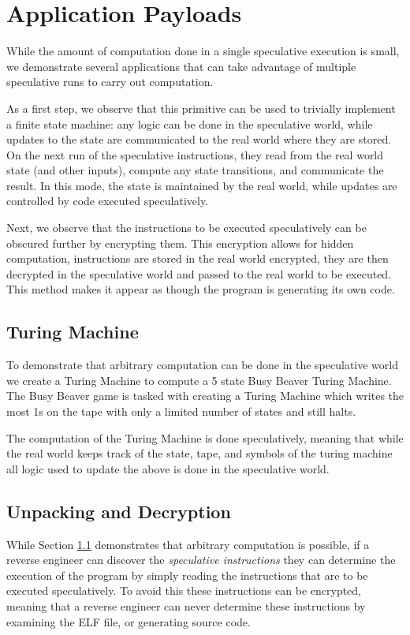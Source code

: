 
\section{Application Payloads}

While the amount of computation done in a single speculative execution is small,
we demonstrate several applications that can take advantage of multiple
speculative runs to carry out computation.

As a first step, we observe that this primitive can be used to trivially
implement a finite state machine: any logic can be done in the speculative
world, while updates to the state are communicated to the real world where they
are stored. On the next run of the speculative instructions, they read from the
real world state (and other inputs), compute any state transitions, and
communicate the result. In this mode, the state is maintained by the real world,
while updates are controlled by code executed speculatively.

Next, we observe that the instructions to be executed speculatively can be
obscured further by encrypting them. This encryption allows for hidden
computation, instructions are stored in the real world encrypted, they are then
decrypted in the speculative world and passed to the real world to be executed.
This method makes it appear as though the program is generating its own code.

\FigGeneralModel

\subsection{Turing Machine}
\label{subsec:turing}
To demonstrate that arbitrary computation can be done in the speculative world
we create a Turing Machine to compute a 5 state Busy Beaver Turing Machine. The
Busy Beaver game is tasked with creating a Turing Machine which writes the most
1s on the tape with only a limited number of states and still halts.

The computation of the Turing Machine is done speculatively, meaning that while
the real world keeps track of the state, tape, and symbols of the turing machine
all logic used to update the above is done in the speculative world.

\subsection{Unpacking and Decryption}
\label{subsec:decryption}
While Section \ref{subsec:turing} demonstrates that arbitrary computation is
possible, if a reverse engineer can discover the \emph{speculative instructions}
they can determine the execution of the program by simply reading the
instructions that are to be executed speculatively. To avoid this these
instructions can be encrypted, meaning that a reverse engineer can never
determine these instructions by examining the ELF file, or generating source
code. 

